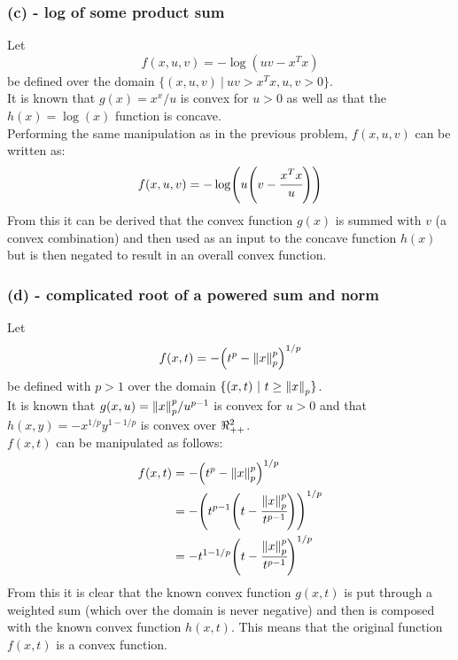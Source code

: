 \documentclass[letter]{article}
\begin{document}
\subsubsection{(c) - log of some product sum}
Let $$f(x,u,v) = - \log(uv - x^T x)$$ be defined over the domain $\{(x,u,v) \ | \ uv > x^T x, u, v > 0\}$.\\
It is known that $g(x) = x^x / u$ is convex for $u>0$ as well as that the $h(x) = \log(x)$ function is concave.\\
Performing the same manipulation as in the previous problem, $f(x,u,v)$ can be written as: $$f(x,u,v) = -\log(u \qty(v - \cfrac{x^Tx}{u}))$$
From this it can be derived that the convex function $g(x)$ is summed with $v$ (a convex combination) and then used as an input to the concave function $h(x)$ but is then negated to result in an overall convex function.


\subsubsection{(d) - complicated root of a powered sum and norm}
Let $$ f(x,t) = -\qty(t^p - \norm{x}_p^p)^{1/p}$$ be defined with $p>1$ over the domain $\{(x,t) \ | \ t \geq \norm{x}_p\}$.\\
It is known that $g(x,u) = \norm{x}_p^p / u^{p-1}$ is convex for $u >0$ and that $h(x,y) = -x^{1/p} y^{1 - 1/p}$ is convex over $\real_{++}^2$.\\
$f(x,t)$ can be manipulated as follows:
\begin{align}
	f(x,t)	&= -\qty(t^p - \norm{x}_p^p)^{1/p}\\
			&= -\qty(t^{p-1}\qty(t - \cfrac{\norm{x}_p^p}{t^{p-1}}))^{1/p}\\
			&= -t^{1 - 1/p}\qty(t - \cfrac{\norm{x}_p^p}{t^{p-1}})^{1/p}\\
\end{align}
From this it is clear that the known convex function $g(x,t)$ is put through a weighted sum (which over the domain is never negative) and then is composed with the known convex function $h(x,t)$. This means that the original function $f(x,t)$ is a convex function.

\newpage
\end{document}
